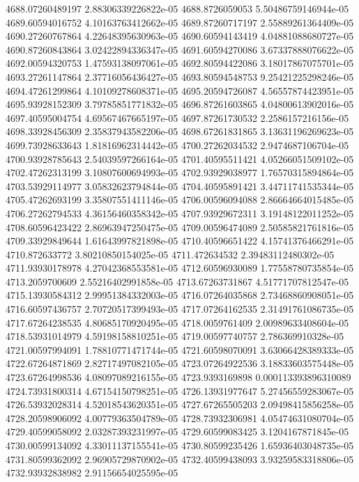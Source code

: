 {4688.07260489197 2.88306339226822e-05
4688.8726059053 5.50486759146944e-05
4689.60594016752 4.10163763412662e-05
4689.87260717197 2.55889261364409e-05
4690.27260767864 4.22648395630963e-05
4690.60594143419 4.04881088680727e-05
4690.87260843864 3.02422894336347e-05
4691.60594270086 3.67337888076622e-05
4692.00594320753 1.47593138097061e-05
4692.80594422086 3.18017867075701e-05
4693.27261147864 2.37716056436427e-05
4693.80594548753 9.25421225298246e-05
4694.47261299864 4.10109278608371e-05
4695.20594726087 4.56557874423951e-05
4695.93928152309 3.79785851771832e-05
4696.87261603865 4.04800613902016e-05
4697.40595004754 4.69567467665197e-05
4697.87261730532 2.2586157216156e-05
4698.33928456309 2.35837943582206e-05
4698.67261831865 3.13631196269623e-05
4699.73928633643 1.81816962314442e-05
4700.27262034532 2.9474687106704e-05
4700.93928785643 2.54039597266164e-05
4701.40595511421 4.05266051509102e-05
4702.47262313199 3.10807600694993e-05
4702.93929038977 1.76570315894864e-05
4703.53929114977 3.05832623794844e-05
4704.40595891421 3.44711741535344e-05
4705.47262693199 3.35807551411146e-05
4706.00596094088 2.86664664015485e-05
4706.27262794533 4.36156460358342e-05
4707.93929672311 3.19148122011252e-05
4708.60596423422 2.86963947250475e-05
4709.00596474089 2.50585821761816e-05
4709.33929849644 1.61643997821898e-05
4710.40596651422 4.15741376466291e-05
4710.872633772 3.80210850154025e-05
4711.472634532 2.39483112480302e-05
4711.93930178978 4.27042368553581e-05
4712.60596930089 1.77558780735854e-05
4713.2059700609 2.55216402991858e-05
4713.67263731867 4.51771707812547e-05
4715.13930584312 2.99951384332003e-05
4716.07264035868 2.73468860908051e-05
4716.60597436757 2.70720517399493e-05
4717.07264162535 2.31491761086735e-05
4717.67264238535 4.80685170920495e-05
4718.0059761409 2.00989633408604e-05
4718.53931014979 4.59198158810251e-05
4719.00597740757 2.786369910328e-05
4721.00597994091 1.78810771471744e-05
4721.60598070091 3.63066428389333e-05
4722.67264871869 2.82717497082105e-05
4723.07264922536 3.18833603575448e-05
4723.67264998536 4.08097089216155e-05
4723.9393169898 0.000113393896310089
4724.73931800314 4.67154150798251e-05
4726.13931977647 5.27456559283067e-05
4726.53932028314 4.52018543620351e-05
4727.67265505203 2.09498415856258e-05
4728.20598906092 4.00779363504789e-05
4728.73932306981 4.05474631080704e-05
4729.40599058092 2.03287393231997e-05
4729.60599083425 3.1204167871845e-05
4730.00599134092 4.33011137155541e-05
4730.80599235426 1.65936403048735e-05
4731.80599362092 2.96905729870902e-05
4732.40599438093 3.93259583318806e-05
4732.93932838982 2.91156654025595e-05
}
